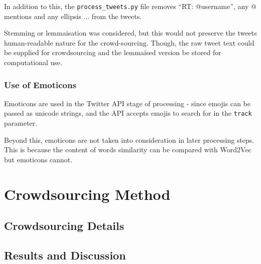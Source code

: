 \documentclass{mproj}
\begin{document}
In addition to this, the \lstinline{process_tweets.py} file removes ``RT: @username'', any @ mentions and any ellipsis ... from the tweets.

Stemming or lemmaisation was considered, but this would not preserve the tweets human-readable nature for the crowd-sourcing. Though, the raw tweet text could be supplied for crowdsourcing and the lemmaised version be stored for computational use.

\subsubsection{Use of Emoticons}

Emoticons are used in the Twitter API stage of processing - since emojis can be passed as unicode strings, and the API accepts emojis to search for in the \lstinline{track} parameter.

Beyond this, emoticons are not taken into consideration in later processing steps. This is because the content of words similarity can be compared with Word2Vec but emoticons cannot.

\section{Crowdsourcing Method}
\subsection{Crowdsourcing Details}
\subsection{Results and Discussion}

%
%
\end{document}
